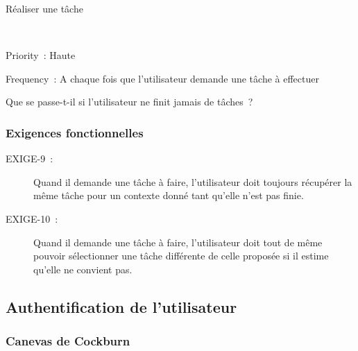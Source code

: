 \begin{usecase}{Réaliser une tâche}
\begin{variation}
\\
\end{variation}
\begin{relatedinformation}
\item[Priority~:] Haute
\item[Frequency~:] A chaque fois que l'utilisateur demande une tâche à effectuer
\\
\end{relatedinformation}
\begin{openissues}
\item Que se passe-t-il si l'utilisateur ne finit jamais de tâches~?
\\
\end{openissues}
\end{usecase}

\subsubsection{Exigences fonctionnelles}

\begin{description}
 \item[EXIGE-9~:] Quand il demande une tâche à faire, l'utilisateur doit toujours récupérer la même tâche pour un contexte donné tant qu'elle n'est pas finie.%
 \item[EXIGE-10~:] Quand il demande une tâche à faire, l'utilisateur doit tout de même pouvoir sélectionner une tâche différente de celle proposée si il estime qu'elle ne convient pas.
 \end{description}


\subsection{Authentification de l'utilisateur}

\subsubsection{Canevas de Cockburn}


